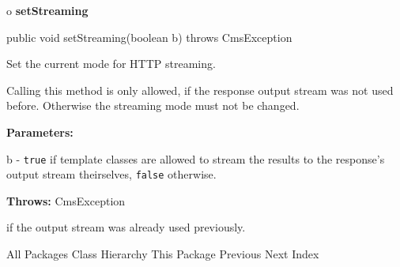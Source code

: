 o {\bf setStreaming} 

\begin{PRE}
 public void setStreaming(boolean b) throws CmsException
\end{PRE}

\begin{description}
\htmlDD Set the current mode for HTTP streaming.

Calling this method is only allowed, if the response output stream was not
used before. Otherwise the streaming mode must not be changed. 

\begin{description}
\item {\bf Parameters:}  

b - {\tt true} if template classes are allowed to stream the  results to the
response's output stream theirselves, {\tt false} otherwise.  
\item {\bf Throws:} CmsException  

if the output stream was already used previously.  
\end{description}

\end{description}

\htmlHR

\begin{PRE}
All Packages  Class Hierarchy  This Package  Previous  Next  Index
\end{PRE}

